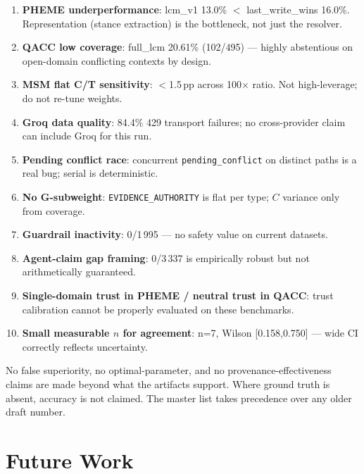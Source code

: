 \documentclass[12pt,a4paper]{article}
\begin{document}
\begin{enumerate}[leftmargin=*]
  \item \textbf{PHEME underperformance}: lcm\_v1 13.0\% $<$ last\_write\_wins 16.0\%. Representation (stance extraction) is the bottleneck, not just the resolver.
  \item \textbf{QACC low coverage}: full\_lcm 20.61\% (102/495) --- highly abstentious on open-domain conflicting contexts by design.
  \item \textbf{MSM flat C/T sensitivity}: $<$1.5\,pp across 100$\times$ ratio. Not high-leverage; do not re-tune weights.
  \item \textbf{Groq data quality}: 84.4\% 429 transport failures; no cross-provider claim can include Groq for this run.
  \item \textbf{Pending conflict race}: concurrent \texttt{pending\_conflict} on distinct paths is a real bug; serial is deterministic.
  \item \textbf{No G-subweight}: \texttt{EVIDENCE\_AUTHORITY} is flat per type; $C$ variance only from coverage.
  \item \textbf{Guardrail inactivity}: 0/1\,995 --- no safety value on current datasets.
  \item \textbf{Agent-claim gap framing}: 0/3\,337 is empirically robust but not arithmetically guaranteed.
  \item \textbf{Single-domain trust in PHEME / neutral trust in QACC}: trust calibration cannot be properly evaluated on these benchmarks.
  \item \textbf{Small measurable $n$ for agreement}: n=7, Wilson [0.158,0.750] --- wide CI correctly reflects uncertainty.
\end{enumerate}

No false superiority, no optimal-parameter, and no provenance-effectiveness claims are made beyond what the artifacts support. Where ground truth is absent, accuracy is not claimed. The master list takes precedence over any older draft number.

\section{Future Work}
\end{document}
